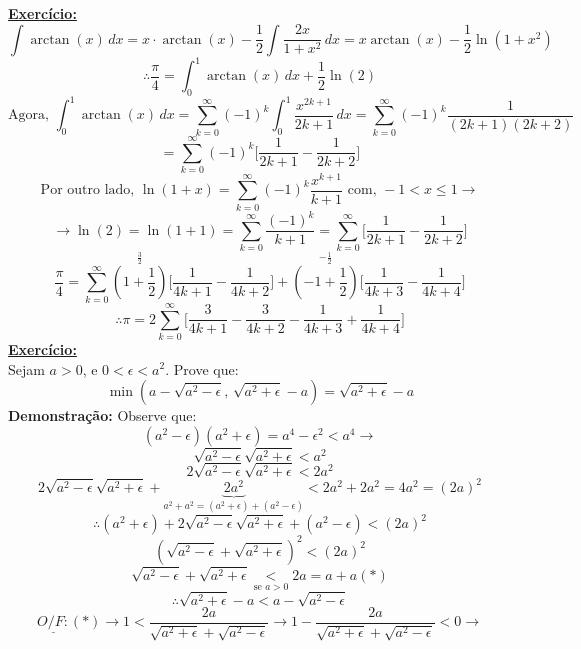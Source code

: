 \documentclass[a4paper, 12pt]{article}
\begin{document}
    \textbf{\underline{Exercício:}} \\
    \[
    \int \arctan(x) \, dx = x \cdot \arctan(x) - \frac{1}{2} \int \frac{2x}{1+x^2} \, dx = x \arctan(x) - \frac{1}{2} \ln(1+x^2)
    \]
    \[
    \therefore \frac{\pi}{4} = \int_{0}^1 \arctan(x) \, dx + \frac{1}{2} \ln(2)
    \]
    \[
    \text{Agora, } \int_{0}^{1} \arctan(x) \, dx = \sum_{k=0}^{\infty} (-1)^k \int_{0}^{1} \frac{x^{2k+1}}{2k+1} \, dx = \sum_{k=0}^{\infty} (-1)^k \frac{1}{(2k+1)(2k+2)}
    \] 
     \[
     = \sum_{k=0}^{\infty} (-1)^k \bigg[\frac{1}{2k+1} - \frac{1}{2k+2}\bigg]
     \]
     \[
     \text{Por outro lado, } \ln(1+x) = \sum_{k=0}^{\infty} (-1)^k \frac{x^{k+1}}{k+1} \text{ com, } -1 < x \leq 1 \rightarrow 
     \]
     \[
     \rightarrow \ln(2) = \ln(1+1) = \sum_{k=0}^{\infty} \frac{(-1)^k}{k+1} = \sum_{k=0}^{\infty} \bigg[\frac{1}{2k+1} - \frac{1}{2k+2}\bigg]
     \]
     \[
     \frac{\pi}{4} = \sum_{k=0}^{\infty} \overset{\frac{3}{2}}{(1+\frac{1}{2})} \bigg[\frac{1}{4k+1} - \frac{1}{4k+2}\bigg] + \overset{-\frac{1}{2}}{(-1+\frac{1}{2})} \bigg[\frac{1}{4k+3} - \frac{1}{4k+4}\bigg]
     \]
     \[
     \therefore \pi = 2 \sum_{k=0}^{\infty} \bigg[\frac{3}{4k+1} - \frac{3}{4k+2} - \frac{1}{4k+3} + \frac{1}{4k+4}\bigg]
     \]
     \textbf{\underline{Exercício:}} \\
     Sejam \( a > 0 \), e \( 0 < \epsilon < a^2 \). Prove que:
     \[
     \min(a - \sqrt{a^2-\epsilon}\text{, }\sqrt{a^2+\epsilon} - a) = \sqrt{a^2+\epsilon} - a
     \]
     \textbf{Demonstração:}
     Observe que:
     \[
     (a^2 - \epsilon)(a^2 + \epsilon) = a^4 - \epsilon^2 < a^4 \rightarrow
     \]
     \[
     \sqrt{a^2-\epsilon} \sqrt{a^2+\epsilon} < a^2
     \]
     \[
     2\sqrt{a^2-\epsilon} \sqrt{a^2+\epsilon} < 2a^2
     \]
     \[
     2\sqrt{a^2-\epsilon} \sqrt{a^2+\epsilon} + \underset{a^2 + a^2 = (a^2 + \epsilon) + (a^2 - \epsilon)}{\underbrace{2a^2}} < 2a^2 + 2a^2 = 4a^2 = (2a)^2
     \]
     \[
     \therefore (a^2+\epsilon) + 2\sqrt{a^2-\epsilon}\sqrt{a^2+\epsilon} + (a^2-\epsilon) < (2a)^2
     \]
     \[
     (\sqrt{a^2-\epsilon}+\sqrt{a^2+\epsilon})^2 < (2a)^2
     \]
     \[
     \sqrt{a^2-\epsilon}+\sqrt{a^2+\epsilon} \underset{\text{se }a>0}{<} 2a = a + a (*)
     \]
     \[
     \therefore \boxed{\sqrt{a^2+\epsilon} - a < a - \sqrt{a^2 - \epsilon}}
     \]
     \[
     \underline{O/F:} (*) \rightarrow 1 < \frac{2a}{\sqrt{a^2+\epsilon} + \sqrt{a^2-\epsilon}} \rightarrow 1 - \frac{2a}{\sqrt{a^2+\epsilon} + \sqrt{a^2-\epsilon}} < 0 \rightarrow
     \]
\end{document}
